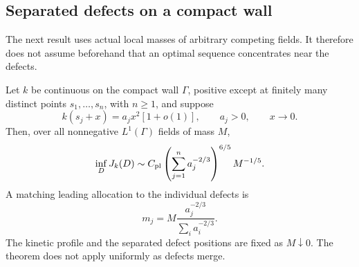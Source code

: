 \subsection{Separated defects on a compact wall}
The next result uses actual local masses of arbitrary competing fields.
It therefore does not assume beforehand that an optimal sequence
concentrates near the defects.
\begin{theorem}
\label{thm:compact-placement}
Let $k$ be continuous on the compact wall $\Gamma$, positive except at
finitely many distinct points $s_1,\ldots,s_n$, with $n\ge1$, and suppose
\begin{equation}\label{eq:placement-local-rate}
 k(s_j+x)=a_jx^2[1+o(1)],\qquad a_j>0,\qquad x\to0.
\end{equation}
Then, over all nonnegative $L^1(\Gamma)$ fields of mass $M$,
\begin{equation}\label{eq:compact-placement}
 \inf_D J_k(D)\sim
 C_{\rm pl}\left(\sum_{j=1}^na_j^{-2/3}\right)^{6/5}M^{-1/5}.
\end{equation}
A matching leading allocation to the individual defects is
\begin{equation}\label{eq:placement-allocation}
 m_j=M\frac{a_j^{-2/3}}{\sum_i a_i^{-2/3}}.
\end{equation}
The kinetic profile and the separated defect positions are fixed as
$M\downarrow0$. The theorem does not apply uniformly as defects merge.
\end{theorem}

